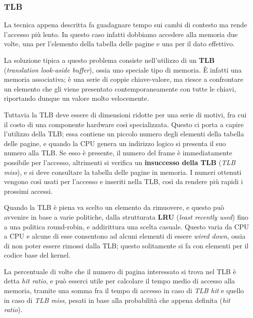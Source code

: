         \subsubsection{TLB}
            La tecnica appena descritta fa guadagnare tempo sui cambi di contesto ma rende l'accesso più lento. In questo caso infatti dobbiamo accedere alla memoria due volte, una per l'elemento della tabella delle pagine e una per il dato effettivo.
            
            La soluzione tipica a questo problema consiste nell'utilizzo di un \textbf{TLB} (\textit{translation look-aside buffer}), ossia uno speciale tipo di memoria. È infatti una memoria associativa; è una serie di coppie chiave-valore, ma riesce a confrontare un elemento che gli viene presentato contemporaneamente con tutte le chiavi, riportando dunque un valore molto velocemente.
            
            Tuttavia la TLB deve essere di dimensioni ridotte per una serie di motivi, fra cui il costo di una componente hardware così specializzata. Questo ci porta a capire l'utilizzo della TLB; essa contiene un piccolo numero degli elementi della tabella delle pagine, e quando la CPU genera un indirizzo logico si presenta il suo numero alla TLB. Se esso è presente, il numero del frame è immediatamente possibile per l'accesso, altrimenti si verifica un \textbf{insuccesso della TLB} (\textit{TLB miss}), e si deve consultare la tabella delle pagine in memoria. I numeri ottenuti vengono così usati per l'accesso e inseriti nella TLB, così da rendere più rapidi i prossimi accessi.
            
            Quando la TLB è piena va scelto un elemento da rimuovere, e questo può avvenire in base a varie politiche, dalla strutturata \textbf{LRU} (\textit{least recently used}) fino a una politica round-robin, e addirittura una scelta casuale. Questo varia da CPU a CPU e alcune di esse consentono ad alcuni elementi di essere \textit{wired down}, ossia di non poter essere rimossi dalla TLB; questo solitamente si fa con elementi per il codice base del kernel.
            
            La percentuale di volte che il numero di pagina interessato si trova nel TLB è detta \textit{hit ratio}, e può esserci utile per calcolare il tempo medio di accesso alla memoria, tramite una somma fra il tempo di accesso in caso di \textit{TLB hit} e quello in caso di \textit{TLB miss}, pesati in base alla probabilità che appena definita (\textit{hit ratio}).
            

